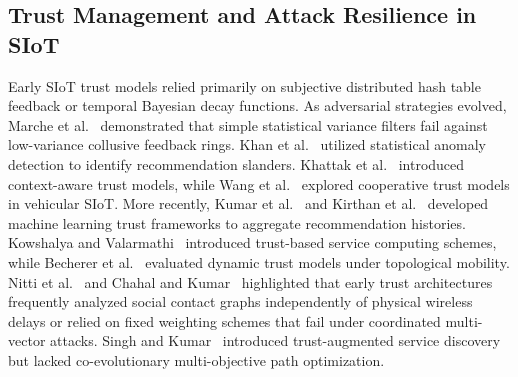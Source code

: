 \documentclass[journal,compsoc]{IEEEtran}
\begin{document}
\subsection{Trust Management and Attack Resilience in SIoT}
Early SIoT trust models relied primarily on subjective distributed hash table feedback or temporal Bayesian decay functions. As adversarial strategies evolved, Marche et al.~\cite{marche2020how} demonstrated that simple statistical variance filters fail against low-variance collusive feedback rings. Khan et al.~\cite{khan2021mitigating} utilized statistical anomaly detection to identify recommendation slanders. Khattak et al.~\cite{khattak2022social} introduced context-aware trust models, while Wang et al.~\cite{wang2022cooperative} explored cooperative trust models in vehicular SIoT. More recently, Kumar et al.~\cite{kumar2024trust} and Kirthan et al.~\cite{kirthan2024trust} developed machine learning trust frameworks to aggregate recommendation histories. Kowshalya and Valarmathi~\cite{kowshalya2021trust} introduced trust-based service computing schemes, while Becherer et al.~\cite{becherer2024evaluating} evaluated dynamic trust models under topological mobility. Nitti et al.~\cite{nitti2021trust} and Chahal and Kumar~\cite{chahal2020secure} highlighted that early trust architectures frequently analyzed social contact graphs independently of physical wireless delays or relied on fixed weighting schemes that fail under coordinated multi-vector attacks. Singh and Kumar~\cite{singh2022trust} introduced trust-augmented service discovery but lacked co-evolutionary multi-objective path optimization.
\end{document}
